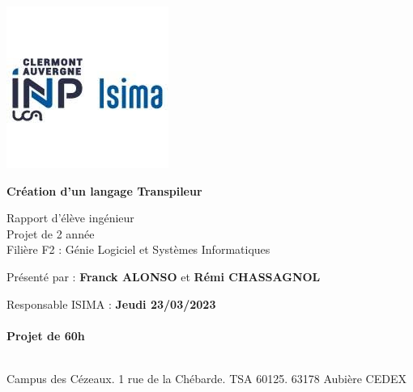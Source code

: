 \begin{titlepage}
    \includegraphics{img/logo_isima_inp.jpeg}
       \begin{center}
           \vspace*{1cm}

           \Huge
           \textbf{Création d'un langage Transpileur}

           \vspace{0.5cm}
           \LARGE
           Rapport d'élève ingénieur\\
           Projet de 2 année\\
           Filière F2 : Génie Logiciel et Systèmes Informatiques

           \vspace{1.5cm}

           Présenté par : \textbf{Franck ALONSO} et \textbf{Rémi CHASSAGNOL}

           \vfill

           \vspace{0.5cm}
         \end{center}


           \large
           \noindent
           Responsable ISIMA : \hfill \textbf{Jeudi 23/03/2023}\\~\\
           \raggedleft \textbf{Projet de 60h}\\~\\
           \raggedright
           Campus des Cézeaux. 1 rue de la Chébarde. TSA 60125. 63178 Aubière CEDEX\\



   \end{titlepage}
